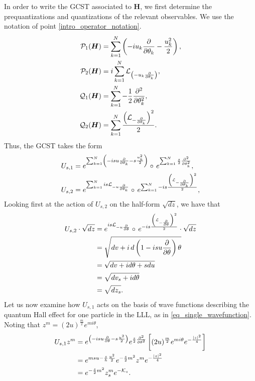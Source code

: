 \documentclass[notas.tex]{subfiles}
\begin{document}
 In order to write the GCST associated to $\bm{H}$, we first determine the prequantizations and quantizations of the relevant observables. We use the notation of point \eqref{intro_operator_notation}.
\begin{align}
\mathcal{P}_1(\bm{H}) &= \sum_{k=1}^{N} \left( - i  u_k\frac{\partial }{\partial \theta_k} - \frac{u_k^2}{2} \right), \nonumber\\
\mathcal{P}_2(\bm{H}) &= i \sum_{k=1}^{N} \mathcal{L}_{\left( - u_k \frac{\partial }{\partial \theta_k} \right)}, \nonumber\\
\mathcal{Q}_1(\bm{H}) & = \sum_{k=1}^{N} -\frac{1}{2} \frac{\partial^2}{\partial \theta_k^2}, \nonumber \\
\mathcal{Q}_2(\bm{H}) & = \sum_{k=1}^{N} \frac{\left( \mathcal{L}_{-\frac{\partial }{\partial \theta_k}}\right)^2}{2} . \nonumber
\end{align}
Thus, the GCST takes the form
\begin{align}
	U_{s,1} &= e^{\sum_{k=1}^{N} \left(- isu\pd{\theta_k} - s\frac{u_k^2}{2} \right)} \circ e^{\sum_{k=1}^{N} \frac{s}{2}\frac{\partial^2}{\partial \theta_k^2}}, \label{eq_gcst_plane_first }\\ 
	U_{s,2} &= e^{\sum_{k=1}^{N} i s\lied{-u \pd{\theta_k}} } \circ e^{\sum_{k=1}^{N} - i s \frac{\left( \lied{-\pd{\theta_k}}\right)^2}{2}}, \label{eq_gcst_plane_second}
\end{align}
Looking first at the action of $U_{s,2}$ on the half-form $\sqrt{dz}$, we have that
\begin{align*}
	U_{s,2} \cdot \sqrt{dz} &= e^{i s\lied{-u \pd{\theta}} }\circ e^{- i s \frac{\left( \lied{-\pd{\theta}}\right)^2}{2}} \cdot \sqrt{dz} \\
	&= \sqrt{dv + i \, d \left( 1 - i s u \pd{\theta} \right)\theta}\\
	&= \sqrt{dv + i d \theta + s du} \\
	&= \sqrt{dv_{s} + i d \theta} \\
	&= \sqrt{dz_{s}}.
\end{align*}
Let us now examine how $U_{s,1}$ acts on the basis of wave functions describing the quantum Hall effect for one particle in the LLL, as in \eqref{eq_single_wavefunction}. Noting that $z^m = (2u)^\frac{m}{2} e^{m i \theta}$,
\begin{align} \label{eq_plane_spf_evolution}
	U_{s,1} z^m &= e^{\left( - isu\frac{\partial }{\partial \theta} - s\frac{u^2}{2} \right ) }e^{\frac{s}{2}\frac{\partial^2}{\partial \theta^2}} \left[ (2u)^\frac{m}{2} e^{m i \theta} e^{- \frac{\left|z\right|^2}{4}}\right ] \nonumber \\
	&= e^{m s u - \frac{s}{h}\frac{u^2}{2}}e^{-\frac{s}{2}m^2} z^m e^{- \frac{\left|z\right|^2}{4}} \\
	&= e^{-\frac{s}{2}m^2} z^m_s e^{-\mathcal{K}_s}. \nonumber
\end{align}
\end{document}
